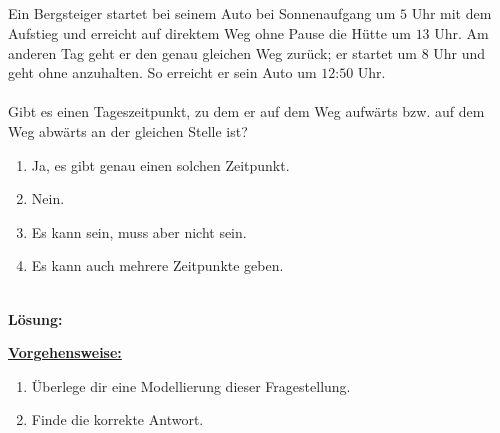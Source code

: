 \subsection*{}
Ein Bergsteiger startet bei seinem Auto bei Sonnenaufgang um $ 5 $ Uhr mit dem Aufstieg und erreicht auf direktem Weg ohne Pause die Hütte um $ 13 $ Uhr.
Am anderen Tag geht er den genau gleichen Weg zurück; er startet um $ 8 $ Uhr und geht ohne anzuhalten. So erreicht er sein Auto um $12$:$50$ Uhr.\\
\\
Gibt es einen Tageszeitpunkt, zu dem er auf dem Weg aufwärts bzw. auf dem Weg abwärts an der gleichen Stelle ist? 
\renewcommand{\labelenumi}{(\alph{enumi})}
\begin{enumerate}
	\item 
	Ja, es gibt genau einen solchen Zeitpunkt.
	\item 
	Nein.
	\item
	Es kann sein, muss aber nicht sein.
	\item
	Es kann auch mehrere Zeitpunkte geben.
\end{enumerate}
\ \\
\textbf{Lösung:}
\begin{mdframed}
\underline{\textbf{Vorgehensweise:}}
\renewcommand{\labelenumi}{\theenumi.}
\begin{enumerate}
\item Überlege dir eine Modellierung dieser Fragestellung.
\item Finde die korrekte Antwort.
\end{enumerate}
\end{mdframed}

